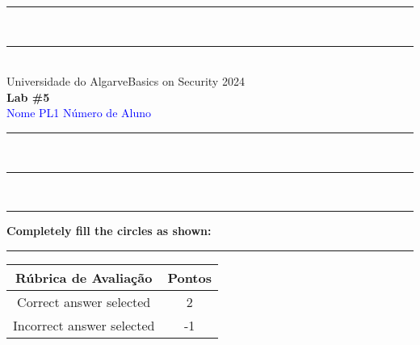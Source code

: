 \documentclass{article} %
\begin{document}
\begin{center}
\rule{\textwidth}{.0075in} \\
\rule[3mm]{\textwidth}{.0075in}\\

Universidade do Algarve\hfill Basics on Security \hfill 2024\\[3ex]

{\Large\bf Lab \#5} \\[3ex]

 \textcolor{blue}{Nome} \hfill  
 \textcolor{blue}{PL1} \hfill
 \textcolor{blue}{Número de Aluno}\\

\rule{\textwidth}{.0075in} \\
\rule[3mm]{\textwidth}{.0075in} \\
\end{center}


\begin{center}
\rule{\textwidth}{0.4pt}
\textbf{Completely fill the circles as shown: \Circle \Circle \CIRCLE \Circle}
\rule{\textwidth}{0.4pt}
\end{center}


\bigskip
\bigskip

{\Large
\begin{tabular}{|c|c|} \hline
\textbf{Rúbrica de Avaliação}  & \textbf{Pontos}\\ \hline
Correct answer selected & 2\\  \hline
Incorrect answer selected & -1\\  \hline
\end{tabular}
}

\bigskip
\bigskip
\end{document}
